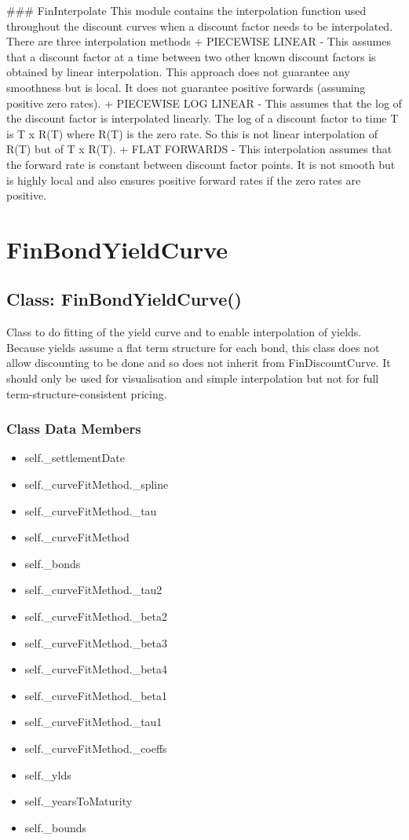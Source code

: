 \documentclass[twoside,11pt]{book}
\begin{document}
### FinInterpolate
This module contains the interpolation function used throughout the discount curves when a discount factor needs to be interpolated. There are three interpolation methods
+ PIECEWISE LINEAR - This assumes that a discount factor at a time between two other known discount factors is obtained by linear interpolation. This approach does not guarantee any smoothness but is local. It does not guarantee positive forwards (assuming positive zero rates).
+ PIECEWISE LOG LINEAR - This assumes that the log of the discount factor is interpolated linearly. The log of a discount factor to time T is T x R(T) where R(T) is the zero rate. So this is not linear interpolation of R(T) but of T x R(T).
+ FLAT FORWARDS - This interpolation assumes that the forward rate is constant between discount factor points. It is not smooth but is highly local and also ensures positive forward rates if the zero rates are positive.

\newpage
\section{FinBondYieldCurve}

\subsection{Class: FinBondYieldCurve()}
Class to do fitting of the yield curve and to enable interpolation of yields. Because yields assume a flat term structure for each bond, this class does not allow discounting to be done and so does not inherit from FinDiscountCurve. It should only be used for visualisation and simple interpolation but not for full term-structure-consistent pricing. 

\subsubsection{Class Data Members}
\begin{itemize}
\item{self.\_settlementDate}
\item{self.\_curveFitMethod.\_spline}
\item{self.\_curveFitMethod.\_tau}
\item{self.\_curveFitMethod}
\item{self.\_bonds}
\item{self.\_curveFitMethod.\_tau2}
\item{self.\_curveFitMethod.\_beta2}
\item{self.\_curveFitMethod.\_beta3}
\item{self.\_curveFitMethod.\_beta4}
\item{self.\_curveFitMethod.\_beta1}
\item{self.\_curveFitMethod.\_tau1}
\item{self.\_curveFitMethod.\_coeffs}
\item{self.\_ylds}
\item{self.\_yearsToMaturity}
\item{self.\_bounds}
\end{itemize}
\end{document}
